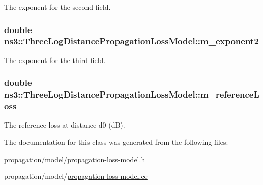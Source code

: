 The exponent for the second field. 

\subsubsection[{\texorpdfstring{m\+\_\+exponent2}{m_exponent2}}]{\setlength{\rightskip}{0pt plus 5cm}double ns3\+::\+Three\+Log\+Distance\+Propagation\+Loss\+Model\+::m\+\_\+exponent2\hspace{0.3cm}{\ttfamily [private]}}\hypertarget{classns3_1_1ThreeLogDistancePropagationLossModel_a709711d469a1d3ce799a73b403f40868}{}\label{classns3_1_1ThreeLogDistancePropagationLossModel_a709711d469a1d3ce799a73b403f40868}


The exponent for the third field. 

\subsubsection[{\texorpdfstring{m\+\_\+reference\+Loss}{m_referenceLoss}}]{\setlength{\rightskip}{0pt plus 5cm}double ns3\+::\+Three\+Log\+Distance\+Propagation\+Loss\+Model\+::m\+\_\+reference\+Loss\hspace{0.3cm}{\ttfamily [private]}}\hypertarget{classns3_1_1ThreeLogDistancePropagationLossModel_a0d010a84de61ec8bb123467b6cae6ffb}{}\label{classns3_1_1ThreeLogDistancePropagationLossModel_a0d010a84de61ec8bb123467b6cae6ffb}


The reference loss at distance d0 (dB). 



The documentation for this class was generated from the following files\+:\begin{DoxyCompactItemize}
\item 
propagation/model/\hyperlink{propagation-loss-model_8h}{propagation-\/loss-\/model.\+h}\item 
propagation/model/\hyperlink{propagation-loss-model_8cc}{propagation-\/loss-\/model.\+cc}\end{DoxyCompactItemize}

